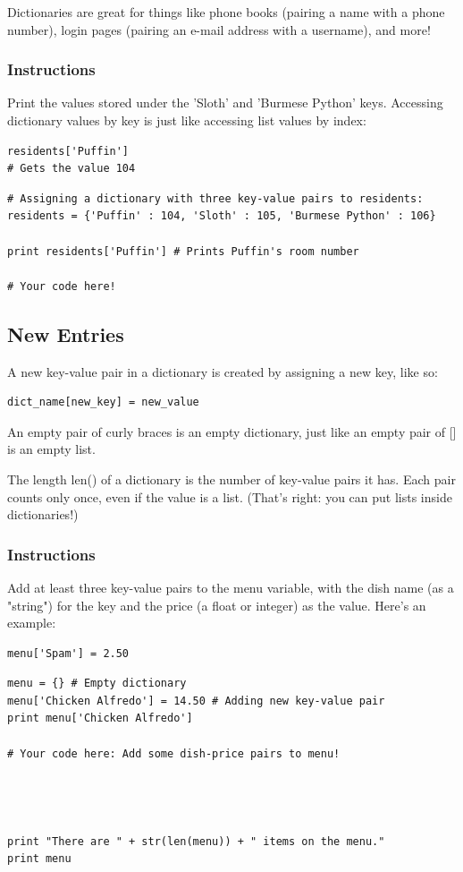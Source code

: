 \documentclass[12pt,a4paper,final,twoside,onecolumn,titlepage]{book}
\begin{document}
Dictionaries are great for things like phone books (pairing a name with a phone number), login pages (pairing an e-mail address with a username), and more!
\subsubsection{Instructions}

Print the values stored under the 'Sloth' and 'Burmese Python' keys. Accessing dictionary values by key is just like accessing list values by index:
\begin{lstlisting}
residents['Puffin']
# Gets the value 104
\end{lstlisting}

\begin{lstlisting}
# Assigning a dictionary with three key-value pairs to residents:
residents = {'Puffin' : 104, 'Sloth' : 105, 'Burmese Python' : 106}

print residents['Puffin'] # Prints Puffin's room number

# Your code here!

\end{lstlisting}

\subsection{New Entries}

A new key-value pair in a dictionary is created by assigning a new key, like so:
\begin{lstlisting}
dict_name[new_key] = new_value
\end{lstlisting}
An empty pair of curly braces {} is an empty dictionary, just like an empty pair of [] is an empty list.

The length len() of a dictionary is the number of key-value pairs it has. Each pair counts only once, even if the value is a list. (That's right: you can put lists inside dictionaries!)
\subsubsection{Instructions}

Add at least three key-value pairs to the menu variable, with the dish name (as a "string") for the key and the price (a float or integer) as the value. Here's an example:
\begin{lstlisting}
menu['Spam'] = 2.50
\end{lstlisting}

\begin{lstlisting}
menu = {} # Empty dictionary
menu['Chicken Alfredo'] = 14.50 # Adding new key-value pair
print menu['Chicken Alfredo']

# Your code here: Add some dish-price pairs to menu!




print "There are " + str(len(menu)) + " items on the menu."
print menu
\end{lstlisting}
\end{document}
